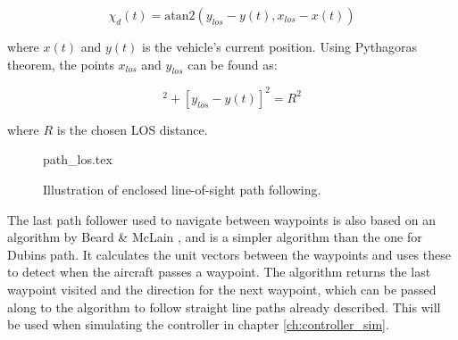 \begin{equation}
	\chi_d(t) = \text{atan2}(y_{los} - y(t), x_{los} - x(t))
\end{equation}

where $x(t)$ and $y(t)$ is the vehicle's current position. Using Pythagoras theorem, the points $x_{los}$ and $y_{los}$ can be found as:

\begin{equation}
	[x_{los} - x(t)]^2 + [y_{los} - y(t)]^2 = R^2
\end{equation}

where $R$ is the chosen LOS distance.

\begin{figure}
	{path_los.tex}
	\caption{Illustration of enclosed line-of-sight path following.}
	\label{fig:path_los}
\end{figure}

The last path follower used to navigate between waypoints is also based on an algorithm by Beard \& McLain \cite{suaBEARD}, and is a simpler algorithm than the one for Dubins path. It calculates the unit vectors between the waypoints and uses these to detect when the aircraft passes a waypoint. The algorithm returns the last waypoint visited and the direction for the next waypoint, which can be passed along to the algorithm to follow straight line paths already described. This will be used when simulating the controller in chapter \ref{ch:controller_sim}.